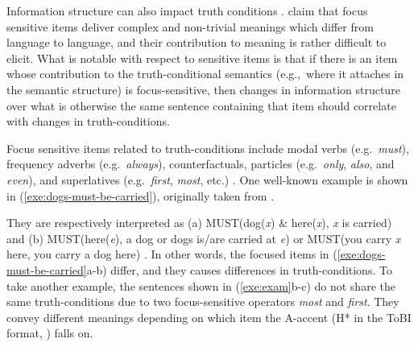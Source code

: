 Information structure can also impact truth conditions
\citep{partee:91,gundel:99}. \citet{beaver:clark:08} claim that focus sensitive items
deliver complex and non-trivial meanings which differ from language to
language, and their contribution to meaning is rather difficult to
elicit.  What is notable with respect to  sensitive items
is that if there is an item whose contribution to the
truth-conditional semantics (e.g.,\ where it attaches in the semantic
structure) is focus-sensitive, then changes in information structure
over what is otherwise the same sentence containing that item should
correlate with changes in truth-conditions.


Focus sensitive items related to truth-conditions include modal verbs
(e.g.\ \textit{must}), frequency adverbs (e.g.\ \textit{always}),
counterfactuals,  particles (e.g.\ \textit{only},
\textit{also}, and \textit{even}), and superlatives
(e.g.\ \textit{first}, \textit{most}, etc.)  \citep{partee:91}.  One
well-known example is shown in (\ref{exe:dogs-must-be-carried}),
originally taken from \citet{halliday:70}.




\noindent They are respectively interpreted as (a)
MUST(dog(\textit{x}) \& here(\textit{x}), \textit{x} is carried) and
(b) MUST(here(\textit{e}), a dog or dogs is/are carried at \textit{e})
or MUST(you carry \textit{x} here, you carry a dog here)
\citep[p.\ 169]{partee:91}.  In other words, the focused items in
(\ref{exe:dogs-must-be-carried}a-b) differ, and they causes
differences in truth-conditions. To take another
example, the sentences shown in (\ref{exe:exam}b-c) do not share the
same truth-conditions due to two focus-sensitive operators
\textit{most} and \textit{first}.  They convey different meanings
depending on which item the A-accent (H* in the ToBI format,
\citep{bolinger:61,jackendoff:72}) falls
on.





